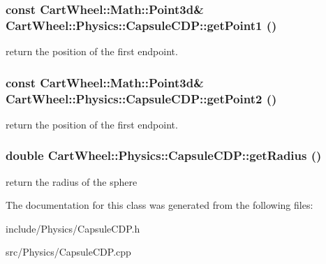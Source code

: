 \hypertarget{classCartWheel_1_1Physics_1_1CapsuleCDP_a8601b16480a789f1c3e95635bb2bdc50}{
\subsubsection[{getPoint1}]{\setlength{\rightskip}{0pt plus 5cm}const {\bf CartWheel::Math::Point3d}\& CartWheel::Physics::CapsuleCDP::getPoint1 ()}}
\label{classCartWheel_1_1Physics_1_1CapsuleCDP_a8601b16480a789f1c3e95635bb2bdc50}
return the position of the first endpoint. \hypertarget{classCartWheel_1_1Physics_1_1CapsuleCDP_a76b9615f66c3b48845eb4827bdae25bd}{
\subsubsection[{getPoint2}]{\setlength{\rightskip}{0pt plus 5cm}const {\bf CartWheel::Math::Point3d}\& CartWheel::Physics::CapsuleCDP::getPoint2 ()}}
\label{classCartWheel_1_1Physics_1_1CapsuleCDP_a76b9615f66c3b48845eb4827bdae25bd}
return the position of the first endpoint. \hypertarget{classCartWheel_1_1Physics_1_1CapsuleCDP_a14c33956b26102cc523ce6098ade6fd8}{
\subsubsection[{getRadius}]{\setlength{\rightskip}{0pt plus 5cm}double CartWheel::Physics::CapsuleCDP::getRadius ()}}
\label{classCartWheel_1_1Physics_1_1CapsuleCDP_a14c33956b26102cc523ce6098ade6fd8}
return the radius of the sphere 

The documentation for this class was generated from the following files:\begin{DoxyCompactItemize}
\item 
include/Physics/CapsuleCDP.h\item 
src/Physics/CapsuleCDP.cpp\end{DoxyCompactItemize}
